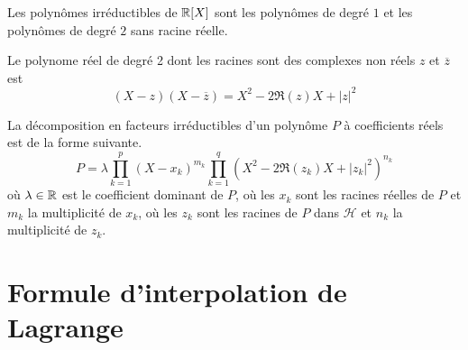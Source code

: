 \begin{prop}
Les polynômes irréductibles de $\mathbb{R}[X]$ sont les polynômes de degré $1$ et les polynômes de degré $2$ sans racine réelle.
\end{prop}
\begin{rem}
 Le polynome réel de degré 2 dont les racines sont des complexes non réels $z$ et $\overline{z}$ est
\begin{displaymath}
 (X-z)(X-\overline{z})=X^2 - 2\Re(z)X+|z|^2
\end{displaymath}
\end{rem}


\begin{prop}
 La décomposition en facteurs irréductibles d'un polynôme $P$ à coefficients réels est de la forme suivante.
\begin{displaymath}
 P = \lambda \prod_{k=1}^p(X-x_k)^{m_k}\prod_{k=1}^q(X^2 - 2\Re(z_k)X+|z_k|^2)^{n_k}
\end{displaymath}
où $\lambda\in \mathbb{R}$ est le coefficient dominant de $P$, où les $x_k$ sont les racines réelles de $P$ et $m_k$ la multiplicité de $x_k$, où les $z_k$ sont les racines de $P$ dans $\mathcal H$ et $n_k$ la multiplicité de $z_k$.
\end{prop}


\section{Formule d'interpolation de Lagrange}


